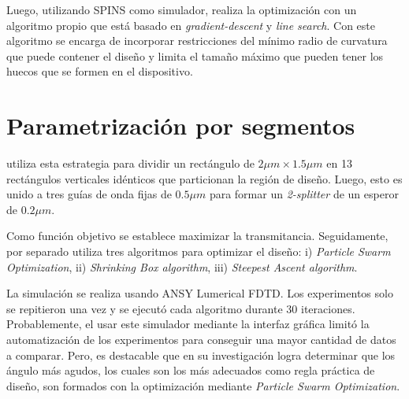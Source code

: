 Luego, utilizando SPINS como simulador, realiza la optimización con un algoritmo propio que está basado en \emph{gradient-descent} y \emph{line search}. 
Con este algoritmo se encarga de incorporar restricciones del mínimo radio de curvatura que puede contener el diseño y limita el tamaño máximo que pueden tener los huecos que se formen en el dispositivo.

\section{Parametrización por segmentos}


\cite{Prosopio-Galarza2019} utiliza esta estrategia para dividir un rectángulo de $2\mu m \times 1.5 \mu m$ en 13 rectángulos verticales idénticos que particionan la región de diseño.
Luego, esto es unido a tres guías de onda fijas de $0.5 \mu m$ para formar un \emph{2-splitter} de un esperor de $0.2 \mu m$.


Como función objetivo se establece maximizar la transmitancia. Seguidamente, por separado utiliza tres algoritmos para optimizar el diseño: i) \emph{Particle Swarm Optimization}, ii) \emph{Shrinking Box algorithm}, iii) \emph{Steepest Ascent algorithm}. 

La simulación se realiza usando ANSY Lumerical FDTD. 
Los experimentos solo se repitieron una vez y se ejecutó cada algoritmo durante 30 iteraciones.
Probablemente, el usar este simulador mediante la interfaz gráfica limitó la automatización de los experimentos para conseguir una mayor cantidad de datos a comparar. 
Pero, es destacable que en su investigación \cite{Prosopio-Galarza2019} logra determinar que los ángulo más agudos, los cuales son los más adecuados como regla práctica de diseño, son formados con la optimización mediante \emph{Particle Swarm Optimization}.

